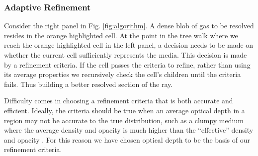 \documentclass[fleq,usenatbib]{mnras}
\begin{document}
\subsubsection{Adaptive Refinement}
Consider the right panel in Fig. \ref{fig:algorithm}. A dense blob of gas 
to be resolved resides in the orange highlighted cell. At the point in the 
tree walk where we reach the orange highlighted cell in the left panel, a 
decision needs to be made on whether the current cell sufficiently represents 
the media. This decision is made by a refinement criteria. If the cell passes 
the criteria to refine, rather than using its average properties we 
recursively check the cell's children until the criteria fails. Thus building 
a better resolved section of the ray. 

Difficulty comes in choosing a refinement criteria that is both accurate and 
efficient. Ideally, the criteria should be true when an average optical depth 
in a region may not be accurate to the true distribution, such as a clumpy 
medium where the average density and opacity is much higher than the 
``effective'' density and opacity \citep{varosiDwek99, hegmanKegel03}. For 
this reason we have chosen optical depth to be the basis of our refinement 
criteria.
\end{document}
